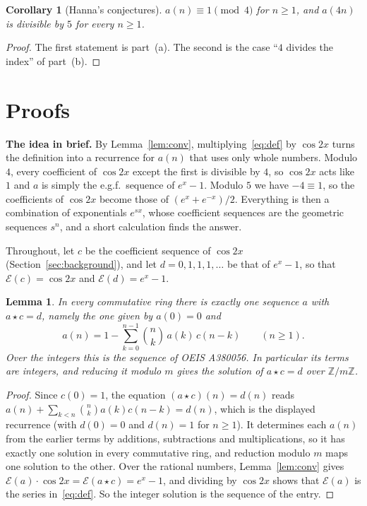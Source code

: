 \documentclass[11pt,a4paper]{article}
\newtheorem{lemma}[theorem]{Lemma}
\newtheorem{corollary}[theorem]{Corollary}
\theoremstyle{definition}
\theoremstyle{remark}
\newcommand{\Z}{\mathbb{Z}}
\newcommand{\para}[1]{\par\medskip\noindent\textbf{#1}\enspace}
\begin{document}
\begin{corollary}[Hanna's conjectures]\label{cor:conj}
$a(n)\equiv1\pmod 4$ for $n\ge1$, and $a(4n)$ is divisible by $5$ for every $n\ge1$.
\end{corollary}

\begin{proof}
The first statement is part~(a). The second is the case ``$4$ divides the index'' of part~(b).
\end{proof}

\section{Proofs}\label{sec:proofs}

\para{The idea in brief.} By Lemma~\ref{lem:conv}, multiplying~\eqref{eq:def} by $\cos2x$ turns the definition into a
recurrence for $a(n)$ that uses only whole numbers. Modulo $4$, every coefficient of $\cos 2x$ except the first is
divisible by $4$, so $\cos2x$ acts like $1$ and $a$ is simply the e.g.f.\ sequence of $e^x-1$. Modulo $5$ we have
$-4\equiv1$, so the coefficients of $\cos2x$ become those of $(e^x+e^{-x})/2$. Everything is then a combination of
exponentials $e^{sx}$, whose coefficient sequences are the geometric sequences $s^n$, and a short calculation finds
the answer.

Throughout, let $c$ be the coefficient sequence of $\cos 2x$ (Section~\ref{sec:background}), and let
$d=0,1,1,1,\dots$ be that of $e^x-1$, so that $\mathcal E(c)=\cos 2x$ and $\mathcal E(d)=e^x-1$.

\begin{lemma}\label{lem:rec}
In every commutative ring there is exactly one sequence $a$ with $a\star c=d$, namely the one given by $a(0)=0$ and
\[
a(n)=1-\sum_{k=0}^{n-1}\binom nk\,a(k)\,c(n-k)\qquad(n\ge1).
\]
Over the integers this is the sequence of OEIS A380056. In particular its terms are integers, and reducing it
modulo $m$ gives the solution of $a\star c=d$ over $\Z/m\Z$.
\end{lemma}

\begin{proof}
Since $c(0)=1$, the equation $(a\star c)(n)=d(n)$ reads $a(n)+\sum_{k<n}\binom nk a(k)c(n-k)=d(n)$, which is the
displayed recurrence (with $d(0)=0$ and $d(n)=1$ for $n\ge1$). It determines each $a(n)$ from the earlier terms by
additions, subtractions and multiplications, so it has exactly one solution in every commutative ring, and reduction
modulo $m$ maps one solution to the other. Over the rational numbers, Lemma~\ref{lem:conv} gives
$\mathcal E(a)\cdot\cos2x=\mathcal E(a\star c)=e^x-1$, and dividing by $\cos2x$ shows that $\mathcal E(a)$ is the series
in~\eqref{eq:def}. So the integer solution is the sequence of the entry.
\end{proof}
\end{document}
